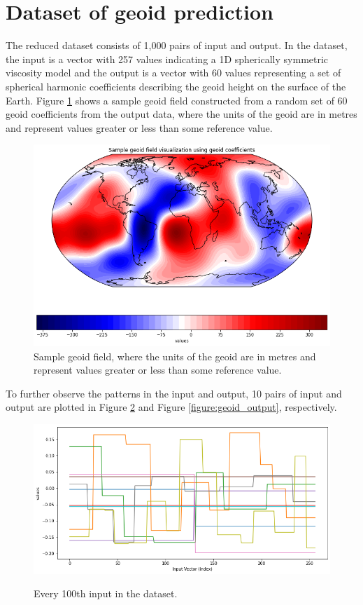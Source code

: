 \section{Dataset of geoid prediction}

The reduced dataset consists of 1,000 pairs of input and output. In the dataset, the input is a vector with 257 values indicating a 1D spherically symmetric viscosity model and the output is a vector with 60 values representing a set of spherical harmonic coefficients describing the geoid height on the surface of the Earth. Figure \ref{figure:geoid_sample} shows a sample geoid field constructed from a random set of 60 geoid coefficients from the output data, where the units of the geoid are in metres and represent values greater or less than some reference value.

\begin{figure}[H]
    \caption{Sample geoid field, where the units of the geoid are in metres and represent values greater or less than some reference value.}
    \label{figure:geoid_sample}
    \includegraphics[scale=0.6]{figures/geoid_images/Geoid_Sample_visualization.png}
\end{figure}

To further observe the patterns in the input and output, 10 pairs of input and output are plotted in Figure \ref{figure:geoid_input} and Figure \ref{figure:geoid_output}, respectively.

\begin{figure}[H]
    \centering
    \caption{Every 100th input in the dataset.}
    \includegraphics[scale=0.5]{figures/geoid_images/Geoid_sample_input.png}
    \label{figure:geoid_input}
\end{figure}

